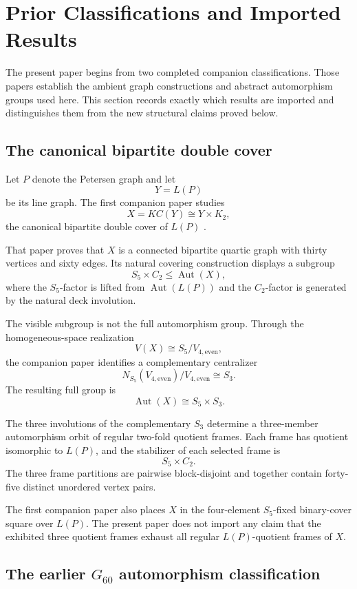 \section{Prior Classifications and Imported Results}

The present paper begins from two completed companion classifications.
Those papers establish the ambient graph constructions and abstract
automorphism groups used here. This section records exactly which
results are imported and distinguishes them from the new structural
claims proved below.

\subsection{The canonical bipartite double cover}

Let \(P\) denote the Petersen graph and let
\[
Y=L(P)
\]
be its line graph. The first companion paper studies
\[
X=KC(Y)\cong Y\times K_2,
\]
the canonical bipartite double cover of \(L(P)\)
\cite{CaveCanonicalBipartite2026}.

That paper proves that \(X\) is a connected bipartite quartic graph
with thirty vertices and sixty edges. Its natural covering
construction displays a subgroup
\[
S_5\times C_2
\leq
\operatorname{Aut}(X),
\]
where the \(S_5\)-factor is lifted from
\(\operatorname{Aut}(L(P))\) and the \(C_2\)-factor is generated by
the natural deck involution.

The visible subgroup is not the full automorphism group. Through the
homogeneous-space realization
\[
V(X)\cong S_5/V_{4,\mathrm{even}},
\]
the companion paper identifies a complementary centralizer
\[
N_{S_5}(V_{4,\mathrm{even}})/V_{4,\mathrm{even}}
\cong S_3.
\]
The resulting full group is
\[
\operatorname{Aut}(X)\cong S_5\times S_3.
\]

The three involutions of the complementary \(S_3\) determine a
three-member automorphism orbit of regular two-fold quotient frames.
Each frame has quotient isomorphic to \(L(P)\), and the stabilizer of
each selected frame is
\[
S_5\times C_2.
\]
The three frame partitions are pairwise block-disjoint and together
contain forty-five distinct unordered vertex pairs.

The first companion paper also places \(X\) in the four-element
\(S_5\)-fixed binary-cover square over \(L(P)\). The present paper does
not import any claim that the exhibited three quotient frames exhaust
all regular \(L(P)\)-quotient frames of \(X\).

\subsection{The earlier \(G_{60}\) automorphism classification}

